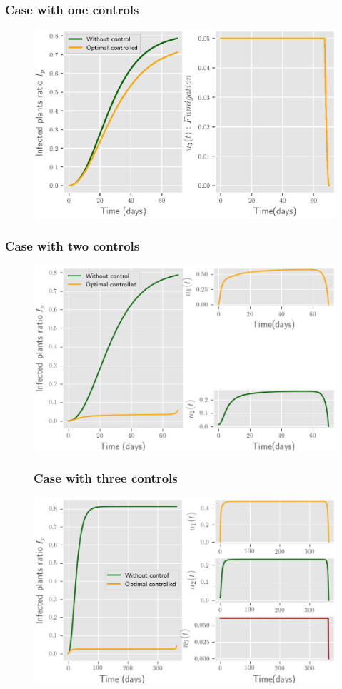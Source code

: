 	\begin{frame}
		\frametitle{Case with one controls}
		\begin{figure}
			\centering	
			\includegraphics[scale=0.5]{Feathergraphics/figure_1_tomato_one_control.eps}
		\end{figure}	
	\end{frame}
	\begin{frame}
		\frametitle{Case with two controls}
		\begin{figure}
			\centering	
			\includegraphics[scale=0.5]{Feathergraphics/two_control_simulation_2.eps}
		\end{figure}	
	\end{frame}
	\begin{frame}
		\begin{figure}
			\frametitle{Case with three controls}
			\centering	
			\includegraphics[scale=0.5]{Feathergraphics/three_controls_simulation_1.eps}
		\end{figure}	
	\end{frame}
